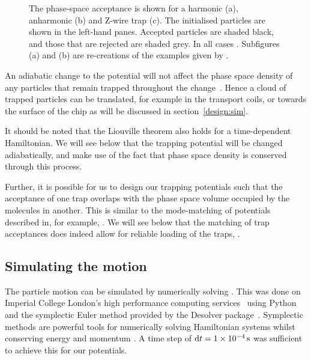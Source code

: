 \begin{figure}
  \centering
  \caption{
    The phase-space acceptance is shown for a harmonic (a), anharmonic (b) and
    Z-wire trap (c). The initialised particles are shown in the left-hand
    panes. Accepted particles are shaded black, and those that are rejected are
    shaded grey. In all cases . Subfigures (a) and (b)
    are re-creations of the examples given by .
  }
  \label{design:fig:psaeg}
\end{figure}

An adiabatic change to the potential will not affect the phase space density of
any particles that remain trapped throughout the change~\cite{Hand1998,
Lichtenberg1969}. Hence a cloud of trapped particles can be translated, for
example in the transport coils, or towards the surface of the chip as will be
discussed in section~\ref{design:sim}.

It should be noted that the Liouville theorem also holds for a time-dependent
Hamiltonian. We will see below that the trapping potential will be changed
adiabatically, and make use of the fact that phase space density is conserved
through this process.

Further, it is possible for us to design our trapping potentials such that the
acceptance of one trap overlaps with the phase space volume occupied by the
molecules in another. This is similar to
the mode-matching of
potentials described in, for example, . We will see below
that the matching of trap acceptances does indeed allow for reliable loading of
the traps, .

\subsection{Simulating the motion}
\label{design:motion:simmethods}


The particle motion can be simulated by numerically solving
. This was done on Imperial College London's high
performance computing services~\cite{ICRCS} using Python~\cite{python} and the
symplectic Euler method provided by the Desolver package~\cite{desolver}.
Symplectic methods are powerful tools for numerically solving Hamiltonian
systems whilst conserving energy and momentum \cite{Hairer2015,
doi:10.1119/1.2034523}. A time step of $\dd t = \SI{1E-4}{\second}$ was
sufficient to achieve this for our potentials.


